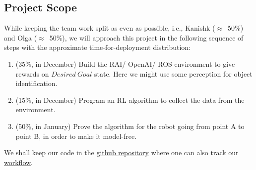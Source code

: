 \documentclass[a4paper,11pt,twoside]{article}
\begin{document}
\subsection{Project Scope} \label{SubSec:ProjectScope}
While keeping the team work split as even as possible, i.e., Kanishk ($\approx$~50\%) and Olga ($\approx$~50\%), we will approach this project in the following sequence of steps with the approximate time-for-deployment distribution:
\begin{enumerate}
\item (35\%, in December) Build the RAI/ OpenAI/ ROS environment to give rewards on $Desired~Goal$ state. Here we might use some perception for object identification.
\item (15\%, in December) Program an RL algorithm to collect the data from the environment.
\item (50\%, in January) Prove the algorithm for the robot going from point A to point B, in order to make it model-free.
\end{enumerate}

We shall keep our code in the \href{https://github.com/KanishkNavale/robotics-lab-project}{github repository} where one can also track our \href{https://github.com/users/KanishkNavale/projects/1/views/1}{workflow}.
\end{document}
